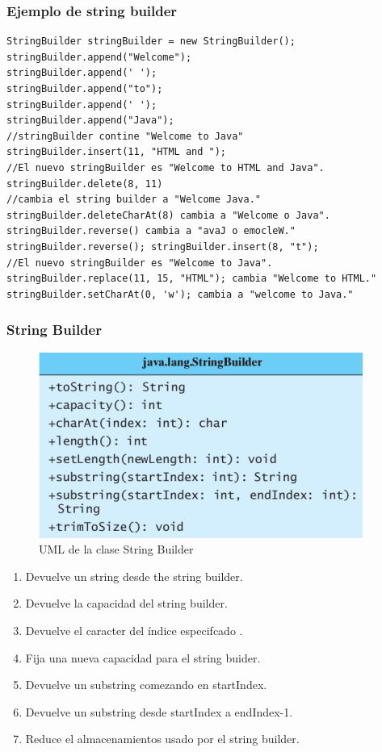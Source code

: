 \documentclass{beamer}
\begin{document}
\begin{frame}[fragile]
\frametitle{Ejemplo de string builder}
\begin{footnotesize}
\begin{verbatim}
StringBuilder stringBuilder = new StringBuilder();
stringBuilder.append("Welcome");
stringBuilder.append(' ');
stringBuilder.append("to");
stringBuilder.append(' ');
stringBuilder.append("Java");
//stringBuilder contine "Welcome to Java"
stringBuilder.insert(11, "HTML and ");
//El nuevo stringBuilder es "Welcome to HTML and Java".
stringBuilder.delete(8, 11) 
//cambia el string builder a "Welcome Java."
stringBuilder.deleteCharAt(8) cambia a "Welcome o Java".
stringBuilder.reverse() cambia a "avaJ o emocleW."
stringBuilder.reverse(); stringBuilder.insert(8, "t");
//El nuevo stringBuilder es "Welcome to Java".
stringBuilder.replace(11, 15, "HTML"); cambia "Welcome to HTML."
stringBuilder.setCharAt(0, 'w'); cambia a "welcome to Java."
\end{verbatim}
\end{footnotesize}
\end{frame}

\begin{frame}
\frametitle{String Builder} 
\begin{multicols}{2}
\begin{figure}
\includegraphics[scale=0.55]{imagenes/sb3.png} 
\caption{UML de la clase String Builder}
\end{figure} 
\begin{scriptsize}
\begin{enumerate}[<+-| alert@+>]
      \item Devuelve un string desde the string builder.
      \item Devuelve la capacidad del string builder.
      \item Devuelve el caracter del índice especifcado .
      \item Fija una nueva capacidad para el string buider.
      \item Devuelve un substring comezando en startIndex.
      \item Devuelve un substring desde startIndex a endIndex-1.
      \item Reduce el almacenamientos usado por el string builder.
      \end{enumerate}
\end{scriptsize}
\end{multicols}
\pause
\end{frame}
\end{document}
